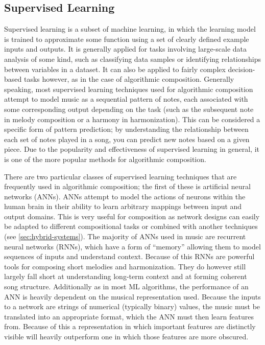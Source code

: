 \documentclass[ author={Stephen Livermore-Tozer},
				supervisor={Dr. Peter Flach},
				degree={MEng},
				title={Performing Algorithmic Co-composition Using Machine Learning},
				subtitle={},
				type={research},
				year={2016} ]{dissertation}
\begin{document}
	\subsection{Supervised Learning}
	\label{sec:supervised-learning}
	
	Supervised learning is a subset of machine learning, in which the learning model is trained to approximate some function using a set of clearly defined example inputs and outputs. It is generally applied for tasks involving large-scale data analysis of some kind, such as classifying data samples or identifying relationships between variables in a dataset. It can also be applied to fairly complex decision-based tasks however, as in the case of algorithmic composition. Generally speaking, most supervised learning techniques used for algorithmic composition attempt to model music as a sequential pattern of notes, each associated with some corresponding output depending on the task (such as the subsequent note in melody composition or a harmony in harmonization). This can be considered a specific form of pattern prediction; by understanding the relationship between each set of notes played in a song, you can predict new notes based on a given piece. Due to the popularity and effectiveness of supervised learning in general, it is one of the more popular methods for algorithmic composition.
	
	There are two particular classes of supervised learning techniques that are frequently used in algorithmic composition; the first of these is artificial neural networks (ANNs). ANNs attempt to model the actions of neurons within the human brain in their ability to learn arbitrary mappings between input and output domains. This is very useful for composition as network designs can easily be adapted to different compositional tasks or combined with another techniques (see \ref{sec:hybrid-systems}). The majority of ANNs used in music are recurrent neural networks (RNNs), which have a form of ``memory'' allowing them to model sequences of inputs and understand context. Because of this RNNs are powerful tools for composing short melodies and harmonization. They do however still largely fall short at understanding long-term context and at forming coherent song structure. Additionally as in most ML algorithms, the performance of an ANN is heavily dependent on the musical representation used. Because the inputs to a network are strings of numerical (typically binary) values, the music must be translated into an appropriate format, which the ANN must then learn features from. Because of this a representation in which important features are distinctly visible will heavily outperform one in which those features are more obscured.
		
\end{document}
